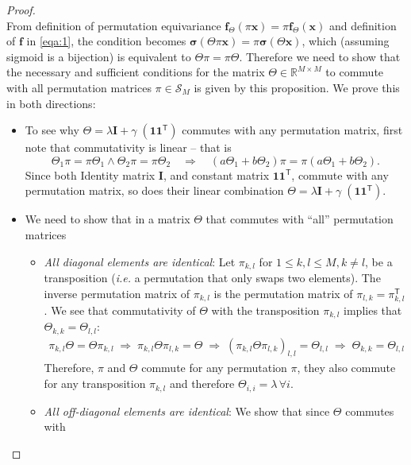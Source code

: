 \documentclass{article}
\newcommand{\xx}[0]{\ensuremath{\mathbf{x}}}
\newcommand{\ff}[0]{\ensuremath{\mathbf{f}}}
\newcommand{\latinphrase}[1]{\emph{#1}}    %
\newcommand{\ie}{\latinphrase{i.e.}\xspace}
\begin{document}
\begin{proof}\\
From definition of permutation equivariance $\ff_{\Theta}(\pi \xx) = \pi \ff_{\Theta}(\xx)$ and definition of $\ff$ in \eqref{eqa:1}, the condition becomes
 $\boldsymbol{\sigma}( \Theta \pi \xx) = \pi \boldsymbol{\sigma}( \Theta \xx)$, which (assuming sigmoid is a bijection) is equivalent to $\Theta \pi = \pi \Theta$. Therefore we need to show that the necessary and sufficient conditions for the matrix $\Theta \in \mathbb{R}^{M \times M}$ to commute with all permutation matrices $\pi \in \mathcal{S}_M$ is given by this proposition.
We prove this in both directions:
   \begin{itemize}
   \item To see why $\Theta = {\lambda} \mathbf{I} + {\gamma} \; (\mathbf{1} \mathbf{1}^{\mathsf{T}})$ commutes with any permutation matrix, first note that commutativity is linear -- that is
$$\Theta_1 \pi = \pi \Theta_1 \wedge \Theta_2 \pi = \pi \Theta_2 \quad \Rightarrow \quad (a \Theta_1 +  b \Theta_2) \pi = \pi (a \Theta_1 +  b \Theta_2).$$
Since both Identity matrix $\mathbf{I}$, and constant matrix $\mathbf{1} \mathbf{1}^\mathsf{T}$, commute with any permutation matrix, so does their linear combination $\Theta = {\lambda} \mathbf{I} + {\gamma} \; (\mathbf{1} \mathbf{1}^{\mathsf{T}})$.
\item We need to show that in a matrix $\Theta$ that commutes with ``all'' permutation matrices
  \begin{itemize}
  \item \textit{All diagonal elements are identical}: Let $\pi_{k,l}$ for $1\leq k,l\leq M, k \neq l$, be a transposition (\ie a permutation that only swaps two elements). The inverse permutation matrix of $\pi_{k,l}$ is the permutation matrix of $\pi_{l,k} = \pi_{k,l}^{\mathsf{T}}$. We see that commutativity of $\Theta$ with the transposition $\pi_{k,l}$ implies that $\Theta_{k,k} = \Theta_{l,l}$: 
    \begin{align*}
  \pi_{k,l} \Theta = \Theta \pi_{k,l} \; \Rightarrow  \; \pi_{k,l} \Theta \pi_{l,k} = \Theta \; \Rightarrow \;  (\pi_{k,l} \Theta \pi_{l,k})_{l,l} = \Theta_{l,l} \; \Rightarrow \;  \Theta_{k,k} = \Theta_{l,l}
    \end{align*}
Therefore, $\pi$ and $\Theta$ commute for any permutation $\pi$, they also commute for any transposition $\pi_{k,l}$ and therefore $\Theta_{i,i} = \lambda\, \forall i$.
\item \textit{All off-diagonal elements are identical}: We show that since $\Theta$ commutes with 

\end{itemize}
\end{itemize}
\end{proof}
\end{document}
